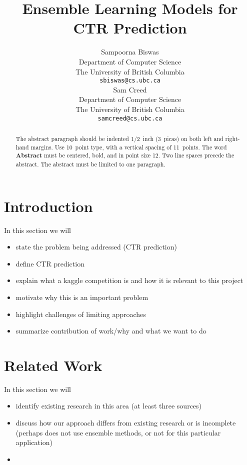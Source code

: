\documentclass{article} %
\title{Ensemble Learning Models for CTR Prediction}
\author{
Sampoorna Biswas \\
Department of Computer Science\\
The University of British Columbia\\
\texttt{sbiswas@cs.ubc.ca} \\
\And
Sam Creed \\
Department of Computer Science\\
The University of British Columbia\\
\texttt{samcreed@cs.ubc.ca} \\
}
\begin{document}
\maketitle

\begin{abstract}
The abstract paragraph should be indented 1/2~inch (3~picas) on both left and
right-hand margins. Use 10~point type, with a vertical spacing of 11~points.
The word \textbf{Abstract} must be centered, bold, and in point size 12. Two
line spaces precede the abstract. The abstract must be limited to one
paragraph.
\end{abstract}

\section{Introduction}

In this section we will

\begin{itemize}
\item state the problem being addressed (CTR prediction)
\item define CTR prediction
\item explain what a kaggle competition is and how it is relevant to this project
\item motivate why this is an important problem
\item highlight challenges of limiting approaches
\item summarize contribution of work/why and what we want to do
\end{itemize}

\section{Related Work}
\label{gen_inst}

In this section we will

\begin{itemize}
\item identify existing research in this area (at least three sources)
\item discuss how our approach differs from existing research or is incomplete (perhaps does not use ensemble methods, or not for this particular application)
\item 

\end{itemize}
\end{document}
